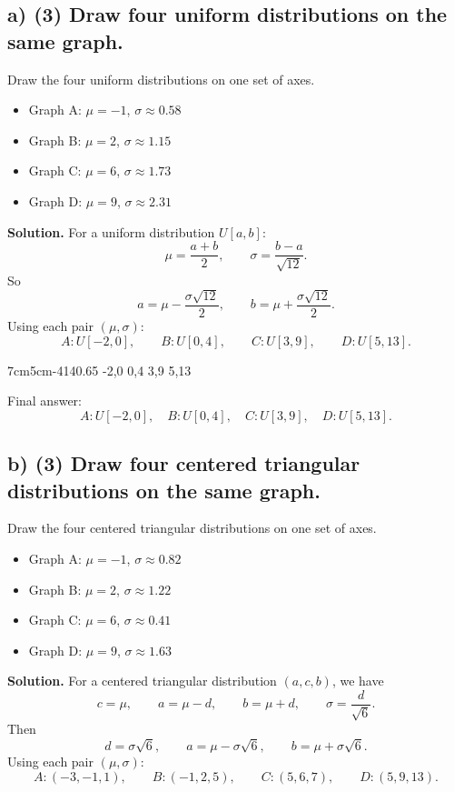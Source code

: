 \subsection*{a) \textbf{(3)} Draw four uniform distributions on the same graph.}
\label{subsec:probability-distribution-graphs-c4-a}
Draw the four uniform distributions on one set of axes.
\begin{itemize}
	\item Graph A: $\mu=-1$, $\sigma\approx0.58$
	\item Graph B: $\mu=2$, $\sigma\approx1.15$
	\item Graph C: $\mu=6$, $\sigma\approx1.73$
	\item Graph D: $\mu=9$, $\sigma\approx2.31$
\end{itemize}
\textbf{Solution.}
For a uniform distribution $U[a,b]$:
\[
\mu=\frac{a+b}{2},
\qquad
\sigma=\frac{b-a}{\sqrt{12}}.
\]
So
\[
a=\mu-\frac{\sigma\sqrt{12}}{2},
\qquad
b=\mu+\frac{\sigma\sqrt{12}}{2}.
\]
Using each pair $(\mu,\sigma)$:
\[
A:U[-2,0],\qquad
B:U[0,4],\qquad
C:U[3,9],\qquad
D:U[5,13].
\]

\UniformFourGraph
{7cm}{5cm}{-4}{14}{0.65}
{-2,0}
{0,4}
{3,9}
{5,13}

Final answer:
\[
A:U[-2,0],\quad B:U[0,4],\quad C:U[3,9],\quad D:U[5,13].
\]


\subsection*{b) \textbf{(3)} Draw four centered triangular distributions on the same graph.}
\label{subsec:probability-distribution-graphs-c4-b}
Draw the four centered triangular distributions on one set of axes.
\begin{itemize}
	\item Graph A: $\mu=-1$, $\sigma\approx0.82$
	\item Graph B: $\mu=2$, $\sigma\approx1.22$
	\item Graph C: $\mu=6$, $\sigma\approx0.41$
	\item Graph D: $\mu=9$, $\sigma\approx1.63$
\end{itemize}
\textbf{Solution.}
For a centered triangular distribution $(a,c,b)$, we have
\[
c=\mu,\qquad a=\mu-d,\qquad b=\mu+d,\qquad \sigma=\frac{d}{\sqrt{6}}.
\]
Then
\[
d=\sigma\sqrt{6},
\qquad
a=\mu-\sigma\sqrt{6},
\qquad
b=\mu+\sigma\sqrt{6}.
\]
Using each pair $(\mu,\sigma)$:
\[
A:(-3,-1,1),\qquad
B:(-1,2,5),\qquad
C:(5,6,7),\qquad
D:(5,9,13).
\]

